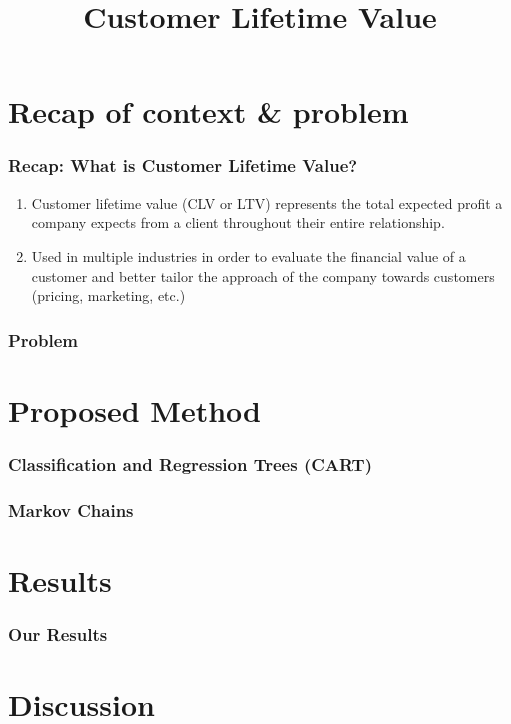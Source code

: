 \documentclass[aspectratio=169,xcolor=x11names,compress]{beamer}
\title{Customer Lifetime Value}
\author{}
\institute{}
\date{}
\begin{document}
\maketitle

\section{Recap of context \& problem}

\begin{frame}
\frametitle{Recap: What is Customer Lifetime Value?}

\begin{enumerate}
    \item Customer lifetime value (CLV or LTV) represents the total expected profit a
    company expects from a client throughout their entire relationship. \pause
    \item Used in multiple industries in order to evaluate the financial value of a
    customer and better tailor the approach of the company towards
    customers (pricing, marketing, etc.) 
\end{enumerate}

\end{frame}

\begin{frame}
\frametitle{Problem}
\end{frame}

\section{Proposed Method}

\begin{frame}
\frametitle{Classification and Regression Trees (CART)}
\end{frame}

\begin{frame}
\frametitle{Markov Chains}
\end{frame}

\section{Results}

\begin{frame}
\frametitle{Our Results}
\end{frame}

\section{Discussion}
\end{document}
